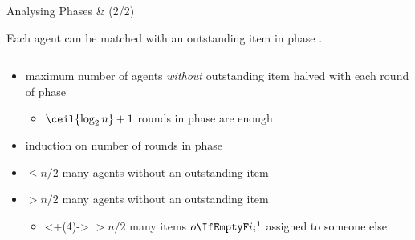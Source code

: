 \begin{frame}{Analysing Phases \phasei{} \& \phaseiii{} (2/2)}
	\adjustfortopblock
	\begin{lemma}
		Each agent can be matched with an outstanding item in phase \phaseiii.
	\end{lemma}
	\begin{columns}[T]
		\begin{column}{0.6\textwidth}
			\pause
			\begin{itemize}[<+->]
				\item
				maximum number of agents \emph{without} outstanding item halved
				with each round of phase \phasei
				\begin{itemize}[<+->]
					\item
					\(\ceil{\log_2 n} + 1\) rounds in phase \phasei{} are enough
				\end{itemize}

				\item
				induction on number of rounds in phase \phasei
			\end{itemize}
			\begin{itemize}[<+->]
				\item
				\(\le n/2\) many agents without an outstanding item

				\item
				\(> n/2\) many agents without an outstanding item
				\begin{itemize}
					\item<+(4)->
					\(> n/2\) many items \(\asgd*{1}\) assigned to someone else


\end{itemize}
\end{itemize}
\end{column}
\end{columns}
\end{frame}
